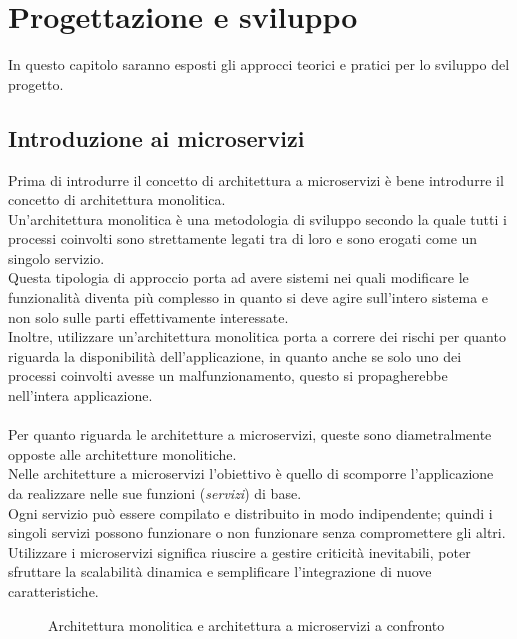 \chapter{Progettazione e sviluppo}\label{chapter:progettazionesviluppo}
In questo capitolo saranno esposti gli approcci teorici e pratici per lo sviluppo del progetto.


\section{Introduzione ai microservizi}\label{sec:microserviziintro}
Prima di introdurre il concetto di architettura a microservizi è bene introdurre il concetto di architettura monolitica.\\
Un’architettura monolitica è una metodologia di sviluppo secondo la quale tutti i processi coinvolti sono strettamente legati tra di loro e sono erogati come un singolo servizio.\\
Questa tipologia di approccio porta ad avere sistemi nei quali modificare le funzionalità diventa più complesso in quanto si deve agire sull’intero sistema e non solo sulle parti effettivamente interessate.\\
Inoltre, utilizzare un’architettura monolitica porta a correre dei rischi per quanto riguarda la disponibilità dell’applicazione, in quanto anche se solo uno dei processi coinvolti avesse un malfunzionamento, questo si propagherebbe nell’intera applicazione.\\ \\
Per quanto riguarda le architetture a microservizi, queste sono diametralmente opposte alle architetture monolitiche.\\
Nelle architetture a microservizi l’obiettivo è quello di scomporre l’applicazione da realizzare nelle sue funzioni (\emph{servizi}) di base.\\
Ogni servizio può essere compilato e distribuito in modo indipendente; quindi i singoli servizi possono funzionare o non funzionare senza compromettere gli altri.\\
Utilizzare i microservizi significa riuscire a gestire criticità inevitabili, poter sfruttare la scalabilità dinamica e semplificare l'integrazione di nuove caratteristiche.\\

\begin{figure}[ht]
	\centering
	\caption{Architettura monolitica e architettura a microservizi a confronto}
	\label{fig:one}
\end{figure}

